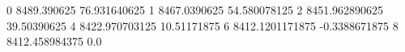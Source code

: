 0 8489.390625 76.931640625
1 8467.0390625 54.580078125
2 8451.962890625 39.50390625
4 8422.970703125 10.51171875
6 8412.1201171875 -0.3388671875
8 8412.458984375 0.0
